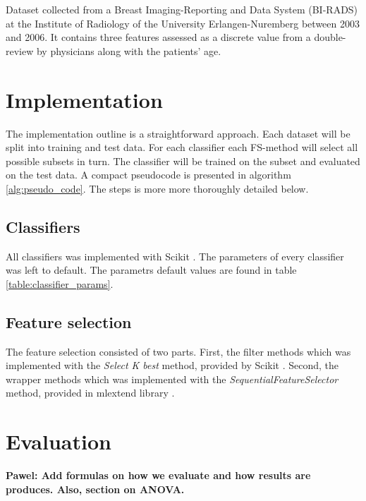 Dataset collected from a Breast Imaging-Reporting and Data System (BI-RADS) at the Institute of Radiology of the University Erlangen-Nuremberg between 2003 and 2006. It contains three features assessed as a discrete value from a double-review by physicians along with the patients' age.




\section{Implementation}

The implementation outline is a straightforward approach. Each dataset will be split into training and test data. For each classifier each FS-method will select all possible subsets in turn. The classifier will be trained on the subset and evaluated on the test data. A compact pseudocode is presented in algorithm \ref{alg:pseudo_code}. The steps is more more thoroughly detailed below. 



\subsection{Classifiers}
All classifiers was implemented with Scikit \parencite{scikit-learn}. The parameters of every classifier was left to default. The parametrs default values are found in table \ref{table:classifier_params}.




\subsection{Feature selection}

The feature selection consisted of two parts. First, the filter methods which was implemented with the \textit{Select K best} method, provided by Scikit \parencite{scikit-learn}. Second, the wrapper methods which was implemented with the \textit{SequentialFeatureSelector} method, provided in mlextend library \parencite{mlextend}.


\section{Evaluation}

\textbf{ Pawel: Add formulas on how we evaluate and how results are produces. Also, section on ANOVA. }



